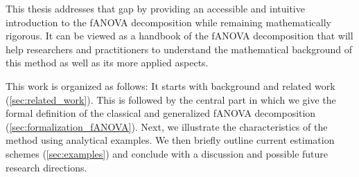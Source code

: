 This thesis addresses that gap by providing an accessible and intuitive introduction to the fANOVA decomposition while remaining mathematically rigorous.
It can be viewed as a handbook of the fANOVA decomposition that will help researchers and practitioners to understand the mathematical background of this method as well as its more applied aspects.

This work is organized as follows: It starts with background and related work (\autoref{sec:related_work}). This is followed by the central part in which we give the formal definition of the classical and generalized fANOVA decomposition (\autoref{sec:formalization_fANOVA}).
Next, we illustrate the characteristics of the method using analytical examples. We then briefly outline current estimation schemes (\autoref{sec:examples}) and conclude with a discussion and possible future research directions.
